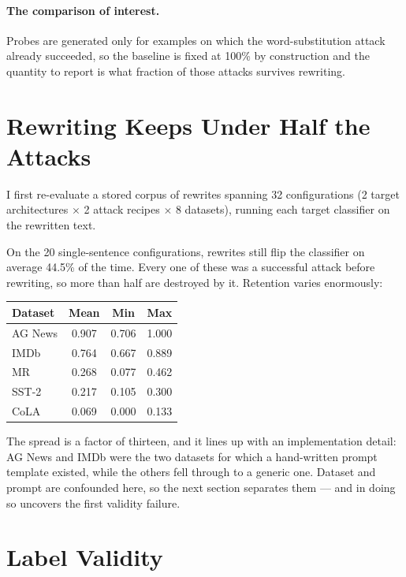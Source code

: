 \documentclass[11pt]{article}
\begin{document}
\paragraph{The comparison of interest.}
Probes are generated only for examples on which the word-substitution attack
already succeeded, so the baseline is fixed at 100\% by construction and the
quantity to report is what fraction of those attacks survives rewriting.

\section{Rewriting Keeps Under Half the Attacks}
\label{sec:cost}

I first re-evaluate a stored corpus of rewrites spanning 32 configurations
(2 target architectures $\times$ 2 attack recipes $\times$ 8 datasets), running
each target classifier on the rewritten text.

On the 20 single-sentence configurations, rewrites still flip the classifier on
average 44.5\% of the time. Every one of these was a successful attack before
rewriting, so more than half are destroyed by it. Retention varies enormously:

\begin{center}
\begin{tabular}{lccc}
\toprule
Dataset & Mean & Min & Max \\
\midrule
AG News & 0.907 & 0.706 & 1.000 \\
IMDb    & 0.764 & 0.667 & 0.889 \\
MR      & 0.268 & 0.077 & 0.462 \\
SST-2   & 0.217 & 0.105 & 0.300 \\
CoLA    & 0.069 & 0.000 & 0.133 \\
\bottomrule
\end{tabular}
\end{center}

The spread is a factor of thirteen, and it lines up with an implementation
detail: AG News and IMDb were the two datasets for which a hand-written prompt
template existed, while the others fell through to a generic one. Dataset and
prompt are confounded here, so the next section separates them --- and in doing
so uncovers the first validity failure.

\section{Label Validity}
\label{sec:label}
\end{document}
